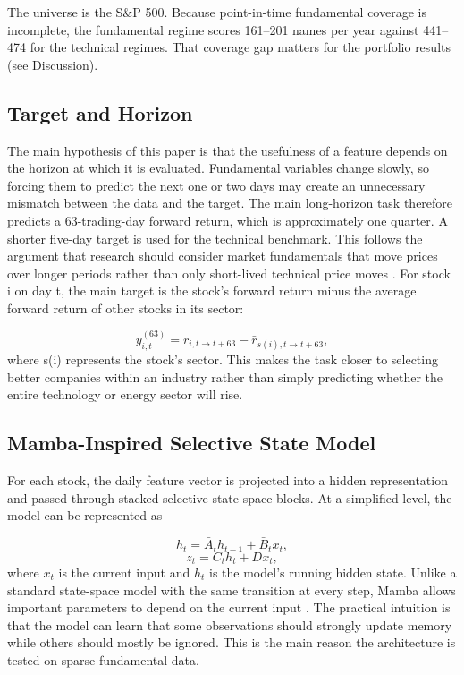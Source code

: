 \documentclass[12pt]{article}
\begin{document}
The universe is the S\&P 500. Because point-in-time fundamental coverage is incomplete, the fundamental regime scores 161--201 names per year against 441--474 for the technical regimes. That coverage gap matters for the portfolio results (see Discussion).

\subsection{Target and Horizon}
The main hypothesis of this paper is that the usefulness of a feature depends on the horizon at which it is evaluated. Fundamental variables change slowly, so forcing them to predict the next one or two days may create an unnecessary mismatch between the data and the target. The main long-horizon task therefore predicts a 63-trading-day forward return, which is approximately one quarter. A shorter five-day target is used for the technical benchmark. This follows the argument that research should consider market fundamentals that move prices over longer periods rather than only short-lived technical price moves \cite{shiller1981}. For stock i on day t, the main target is the stock's forward return minus the average forward return of other stocks in its sector:

\begin{equation}
y_{i,t}^{(63)} = r_{i,t\rightarrow t+63} - \bar{r}_{s(i),t\rightarrow t+63},
\end{equation}
where s(i) represents the stock's sector. This makes the task closer to selecting better companies within an industry rather than simply predicting whether the entire technology or energy sector will rise.

\subsection{Mamba-Inspired Selective State Model}
For each stock, the daily feature vector is projected into a hidden representation and passed through stacked selective state-space blocks. At a simplified level, the model can be represented as

\begin{equation}
h_t = \bar{A}_t h_{t-1} + \bar{B}_t x_t,
\end{equation}
\begin{equation}
z_t = C_t h_t + D x_t,
\end{equation}
where $x_t$ is the current input and $h_t$ is the model's running hidden state. Unlike a standard state-space model with the same transition at every step, Mamba allows important parameters to depend on the current input \cite{gu2023}. The practical intuition is that the model can learn that some observations should strongly update memory while others should mostly be ignored. This is the main reason the architecture is tested on sparse fundamental data.
\end{document}
